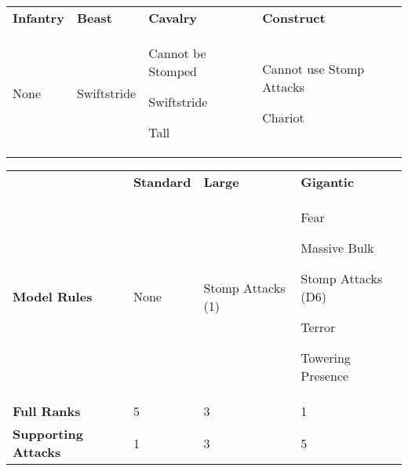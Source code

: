 \documentclass[a4paper,10pt]{article}
\begin{document}
\vspace*{-5pt}

\hspace*{\fill}\begin{tabular}[t]{M{1.2cm} M{1.5cm} M{1.5cm} M{2cm}}
\hline
  \textbf{Infantry} &
  \textbf{Beast} &
  \textbf{Cavalry} &
  \textbf{Construct} \\
   None &
  Swiftstride &
  Cannot be Stomped\par
  Swiftstride\par
  Tall &
  Cannot use Stomp Attacks\par
  Chariot\\
    \hline
\end{tabular}\hfill{\alternaterowcolors\begin{tabular}[t]{M{1.9cm} M{1.6cm} M{2.2cm} M{2.3cm}}
  \hline
  &%
  \textbf{Standard} &%
  \textbf{Large} &%
  \textbf{Gigantic} \\
   \textbf{Model Rules} &%
   None &%
  Stomp Attacks (1)&
  Fear\par
  Massive Bulk\par
  Stomp Attacks (D6)\par
  Terror\par
  Towering Presence\\
  \textbf{Full Ranks}&%
  5 &%
  3 &%
  1 \\
  \textbf{Supporting Attacks}&%
  1&%
  3&%
  5\\
  \hline
\end{tabular}}\hspace*{\fill}

\vspace*{-45pt}
\end{document}
